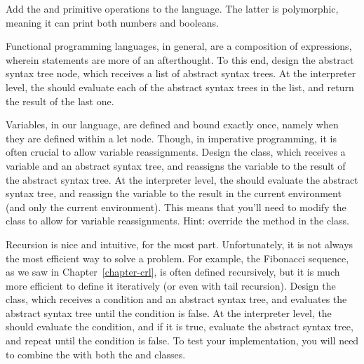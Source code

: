 Add the  and  primitive operations to the language. The latter is polymorphic, meaning it can print both numbers and booleans.

Functional programming languages, in general, are a composition of expressions, wherein statements are more of an afterthought. To this end, design the  abstract syntax tree node, which receives a list of abstract syntax trees. At the interpreter level, the  should evaluate each of the abstract syntax trees in the list, and return the result of the last one.

Variables, in our language, are defined and bound exactly once, namely when they are defined within a let node. Though, in imperative programming, it is often crucial to allow variable reassignments. Design the  class, which receives a variable and an abstract syntax tree, and reassigns the variable to the result of the abstract syntax tree. At the interpreter level, the  should evaluate the abstract syntax tree, and reassign the variable to the result in the current environment (and only the current environment). This means that you'll need to modify the  class to allow for variable reassignments. Hint: override the  method in the  class.

Recursion is nice and intuitive, for the most part. Unfortunately, it is not always the most efficient way to solve a problem. For example, the Fibonacci sequence, as we saw in Chapter~\ref{chapter-crl}, is often defined recursively, but it is much more efficient to define it iteratively (or even with tail recursion). Design the  class, which receives a condition and an abstract syntax tree, and evaluates the abstract syntax tree until the condition is false. At the interpreter level, the  should evaluate the condition, and if it is true, evaluate the abstract syntax tree, and repeat until the condition is false. To test your implementation, you will need to combine the  with both the  and  classes.


